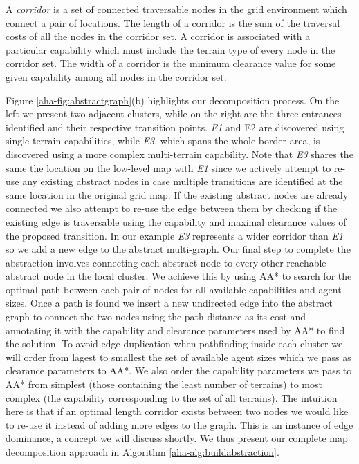\begin{definition}
A \emph{corridor} is a set of connected traversable nodes in the grid environment which connect a pair of locations. The length of a corridor is the sum of the traversal costs of all the nodes in the corridor set. A corridor is associated with a particular capability which must include the terrain type of every node in the corridor set. 
The width of a corridor is the minimum clearance value for some given capability among all nodes in the corridor set. 
\end{definition}

Figure \ref{aha-fig:abstractgraph}(b) highlights our decomposition process. On the left we present two adjacent clusters, while on the right are the three entrances identified and their respective transition points. \emph{E1} and {E2} are discovered using single-terrain capabilities, while \emph{E3}, which spans the whole border area, is discovered using a more complex multi-terrain capability. 
Note that \emph{E3} shares the same the location on the low-level map with \emph{E1} since we actively attempt to re-use any existing abstract nodes in case multiple transitions are identified at the same location in the original grid map. If the existing abstract nodes are already connected we also attempt to re-use the edge between them by checking if the existing edge is traversable using the capability and maximal clearance values of the proposed transition. In our example \emph{E3} represents a wider corridor than \emph{E1} so we add a new edge to the abstract multi-graph. 
\medskip
Our final step to complete the abstraction involves connecting each abstract node to every other reachable abstract node in the local cluster. 
We achieve this by using AA* to search for the optimal path between each pair of nodes for all available capabilities and agent sizes. 
Once a path is found we insert a new undirected edge into the abstract graph to connect the two nodes using the path distance as its cost and annotating it with the capability and clearance parameters used by AA* to find the solution. 
To avoid edge duplication when pathfinding inside each  cluster we will order from lagest to smallest the set of available agent sizes which we pass as clearance parameters to AA*. 
We also order the capability parameters we pass to AA* from simplest (those containing the least number of terrains) to most complex (the capability corresponding to the set of all terrains). 
The intuition here is that if an optimal length corridor exists between two nodes we would like to re-use it instead of adding more edges to the graph. This is an instance of edge dominance, a concept we will discuss shortly.
We thus present our complete map decomposition approach in  Algorithm \ref{aha-alg:buildabstraction}.

